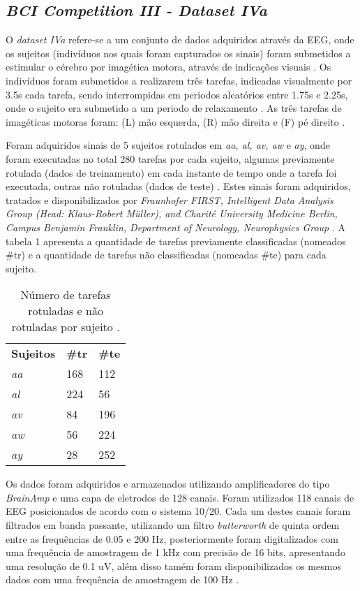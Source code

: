 \subsection{\textit{BCI Competition III - Dataset IVa}}
O \textit{dataset IVa} refere-se a um conjunto de dados adquiridos através da EEG, onde os sujeitos (indivíduos nos quais foram capturados os sinais) foram submetidos a estimular o cérebro por imagética motora, através de indicações visuais \cite{BCICompetition}. Os indivíduos foram submetidos a realizarem três tarefas, indicadas visualmente por 3.5s cada tarefa, sendo interrompidas em periodos aleatórios entre 1.75s e 2.25s, onde o sujeito era submetido a um periodo de relaxamento \cite{BCICompetition}. As três tarefas de imagéticas motoras foram: (L) mão esquerda, (R) mão direita e (F) pé direito \cite{BCICompetition}.

Foram adquiridos sinais de 5 sujeitos rotulados em \textit{aa, al, av, aw} e \textit{ay}, onde foram executadas no total 280 tarefas por cada sujeito, algumas previamente rotulada (dados de treinamento) em cada instante de tempo onde a tarefa foi executada, outras não rotuladas (dados de teste) \cite{siteBCI}. Estes sinais foram adquiridos, tratados e disponibilizados por \textit{Fraunhofer FIRST, Intelligent Data Analysis Group (Head: Klaus-Robert Müller), and Charité University Medicine Berlin, Campus Benjamin Franklin, Department of Neurology, Neurophysics Group} \cite{BCICompetition}. A tabela 1 apresenta a quantidade de tarefas previamente classificadas (nomeados \#tr) e a quantidade de tarefas não classificadas (nomeadas \#te) para cada sujeito.

\begin{table}[h!]
	\centering
	\caption{Número de tarefas rotuladas e não rotuladas por sujeito \cite{BCICompetition}.}
	\label{my-label}
	\begin{tabular}{lll}
		\textbf{Sujeitos} & \textbf{\#tr} & \textbf{\#te} \\
		\textit{aa} & 168 & 112 \\
		\textit{al} & 224 & 56 \\
		\textit{av} & 84 & 196 \\
		\textit{aw} & 56 & 224 \\
		\textit{ay} & 28 & 252
	\end{tabular}
\end{table}

Os dados foram adquiridos e armazenados utilizando amplificadores do tipo \textit{BrainAmp} e uma capa de eletrodos de 128 canais. Foram utilizados 118 canais de EEG posicionados de acordo com o sistema 10/20. Cada um destes canais foram filtrados em banda passante, utilizando um filtro \textit{butterworth} de quinta ordem entre as frequências de 0.05 e 200 Hz, posteriormente foram digitalizados com uma frequência de amostragem de 1 kHz com precisão de 16 bits, apresentando uma resolução de 0.1 uV, além disso tamém foram disponibilizados os mesmos dados com uma frequência de amostragem de 100 Hz \cite{siteBCI}.
 

